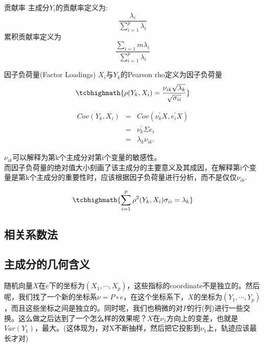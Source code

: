 \begin{sdefinition}{贡献率}{}
主成分$Y_i$的贡献率定义为:
$$
\frac{\lambda_i}{\sum_{i=1}^{p}\lambda_i}
$$
累积贡献率定义为
$$
\frac{\sum_{i=1}{m} \lambda_i}{\sum_{i=1}^{p}\lambda_i}
$$
\end{sdefinition}

\begin{sdefinition}{因子负荷量(Factor Loadings)}{}
$X_i$与$Y_k$的Pearson rho定义为因子负荷量
$$
\tcbhighmath{\rho(Y_k,X_i) = \frac{\nu_{ik} \sqrt{\lambda_k}}{\sqrt{\sigma_{ii}}}}
$$
\end{sdefinition}
\begin{Proof}
	\begin{eqnarray*}
		Cov(Y_k,X_i) &=& Cov(\nu_k^\prime X,e_i^\prime X) \\
		&=& \nu_k^\prime \Sigma e_i \\
		&=& \lambda_k \nu_{ik}.
	\end{eqnarray*}
\end{Proof}
\begin{sremark}{}{}
$\nu_{ik}$可以解释为第k个主成分对第i个变量的敏感性。 \\
而因子负荷量的绝对值大小刻画了该主成分的主要意义及其成因，在解释第i个变量是第k个主成分的重要性时，应该根据因子负荷量进行分析，而不是仅仅$\nu_{ik}$. 
\end{sremark}

\begin{stheorem}{}{}
$$
	\tcbhighmath{\sum_{i=1}^p \rho^2(Y_k,X_i)\sigma_{ii} = \lambda_k}
$$
\end{stheorem}

\subsection{相关系数法}


\subsection{主成分的几何含义}
随机向量$X$在$e$下的坐标为$(X_1,\cdots,X_p)$，这些指标的coordinate不是独立的。然后呢，我们找了一个新的坐标系$\nu = P\circ e$，在这个坐标系下，$X$的坐标为$(Y_1,\cdots,Y_p)$，而且这些坐标之间是独立的。同时呢，我们也稍微的对$P$的行(列)进行一些交换。这么做之后达到了一个怎么样的效果呢？$X$在$\nu_1$方向上的变差，也就是$Var(Y_1)$，最大。(这体现为，对X不断抽样，然后把它投影到$\nu_1$上，轨迹应该最长才对)










